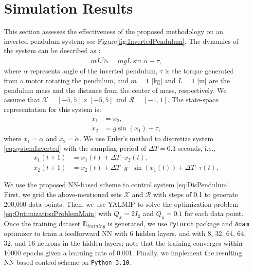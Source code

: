 \documentclass[1p,times]{elsarticle}
\begin{document}
\section{Simulation Results}\label{sec:EV}
This section assesses the effectiveness of the proposed methodology on an inverted pendulum system; see Figure\ref{fig:InvertedPendulum}. {{\color{blue}}The dynamics of the system can be described as \cite{boubaker2013IP}}:
\begin{align}\label{eq:systemInverted}
mL^2\ddot{\alpha} = mgL\sin{\alpha}+\tau,
\end{align}
where $\alpha$ represents angle of the inverted pendulum, $\tau$ is the torque generated from a motor rotating the pendulum, and $m=1$ [kg] and $L=1$ [m] are the pendulum mass and the distance from the center of mass, respectively. We assume that $\mathcal{X}=[-5,5]\times[-5,5]$ and $\mathcal{R}=[-1,1]$. The state-space representation for this system is:
\begin{subequations}
\begin{align}
\dot{x}_1&=x_2,\\
\dot{x}_2&=g\sin\left(x_1\right)+\tau,
\end{align}
\end{subequations}
where $x_1=\alpha$ and $x_2=\dot{\alpha}$. We use Euler's method to discretize system \eqref{eq:systemInverted} with the sampling period of $\Delta T=0.1$ seconds, i.e.,
\begin{subequations}\label{eq:DisPendulum}
\begin{align}
x_1(t+1)&=x_1(t)+\Delta T\cdot x_2(t),\\
x_2(t+1)&=x_2(t)+\Delta T\cdot g\cdot\sin\left(x_1(t)\right)+\Delta T\cdot\tau(t),
\end{align}
\end{subequations}


{{\color{blue}}We use the proposed NN-based scheme to control system \eqref{eq:DisPendulum}. First, we grid the above-mentioned sets $\mathcal{X}$ and $\mathcal{R}$ with steps of 0.1 to generate 200,000 data points. Then, we use YALMIP \cite{Lofberg2004} to solve the optimization problem \eqref{eq:OptimizationProblemMain} with $Q_x=2I_2$ and $Q_u=0.1$ for each data point. Once the training dataset $\mathbb{D}_{training}$ is generated, we use \texttt{Pytorch} package \cite{Pytorch} and \texttt{Adam} optimizer \cite{Adam} to train a feedforward NN with 6 hidden layers, and with 8, 32, 64, 64, 32, and 16 neurons in the hidden layers; note that the training converges within 10000 epochs given a learning rate of 0.001. Finally, we implement the resulting NN-based control scheme on \texttt{Python 3.10}.}
\end{document}
